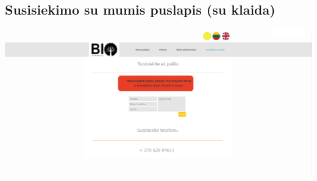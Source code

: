 \documentclass[a4paper,12pt]{article}
\begin{document}
\subsection{Susisiekimo su mumis puslapis (su klaida)}
\hspace{-2cm}
\includegraphics[scale=0.5]{interfeisai/susisiekimasSuKlaida}
\end{document}
